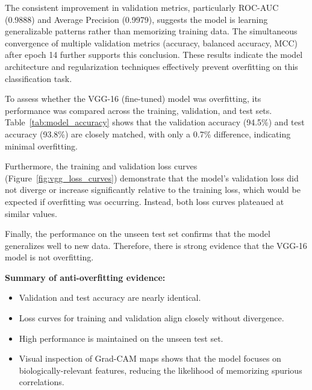 \documentclass[a4paper,12pt]{report}
\begin{document}
The consistent improvement in validation metrics, particularly ROC-AUC (0.9888) and Average Precision (0.9979), suggests the model is learning generalizable patterns rather than memorizing training data. The simultaneous convergence of multiple validation metrics (accuracy, balanced accuracy, MCC) after epoch 14 further supports this conclusion. These results indicate the model architecture and regularization techniques effectively prevent overfitting on this classification task.

To assess whether the VGG-16 (fine-tuned) model was overfitting, its performance was compared across the training, validation, and test sets. Table~\ref{tab:model_accuracy} shows that the validation accuracy (94.5\%) and test accuracy (93.8\%) are closely matched, with only a 0.7\% difference, indicating minimal overfitting.

Furthermore, the training and validation loss curves (Figure~\ref{fig:vgg_loss_curves}) demonstrate that the model’s validation loss did not diverge or increase significantly relative to the training loss, which would be expected if overfitting was occurring. Instead, both loss curves plateaued at similar values.


Finally, the performance on the unseen test set confirms that the model generalizes well to new data. Therefore, there is strong evidence that the VGG-16 model is not overfitting.

\textbf{Summary of anti-overfitting evidence:}
\begin{itemize}
    \item Validation and test accuracy are nearly identical.
    \item Loss curves for training and validation align closely without divergence.
    \item High performance is maintained on the unseen test set.
    \item Visual inspection of Grad-CAM maps shows that the model focuses on biologically-relevant features, reducing the likelihood of memorizing spurious correlations.
\end{itemize}
\end{document}

